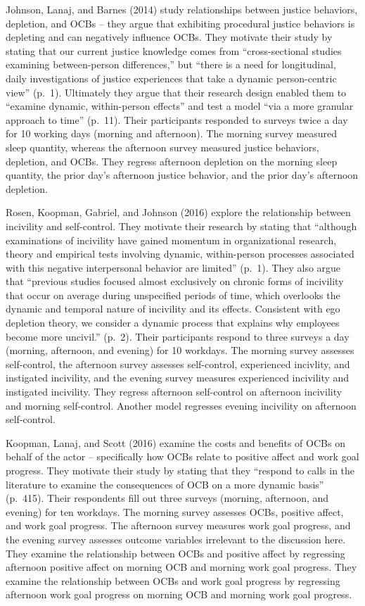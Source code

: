 \documentclass[english,,man]{apa6}
\theoremstyle{definition}
\theoremstyle{definition}
\theoremstyle{definition}
\theoremstyle{remark}
\begin{document}
Johnson, Lanaj, and Barnes (2014) study relationships between justice
behaviors, depletion, and OCBs -- they argue that exhibiting procedural
justice behaviors is depleting and can negatively influence OCBs. They
motivate their study by stating that our current justice knowledge comes
from \enquote{cross-sectional studies examining between-person
differences,} but \enquote{there is a need for longitudinal, daily
investigations of justice experiences that take a dynamic person-centric
view} (p.~1). Ultimately they argue that their research design enabled
them to \enquote{examine dynamic, within-person effects} and test a
model \enquote{via a more granular approach to time} (p.~11). Their
participants responded to surveys twice a day for 10 working days
(morning and afternoon). The morning survey measured sleep quantity,
whereas the afternoon survey measured justice behaviors, depletion, and
OCBs. They regress afternoon depletion on the morning sleep quantity,
the prior day's afternoon justice behavior, and the prior day's
afternoon depletion.

Rosen, Koopman, Gabriel, and Johnson (2016) explore the relationship
between incivility and self-control. They motivate their research by
stating that \enquote{although examinations of incivility have gained
momentum in organizational research, theory and empirical tests
involving dynamic, within-person processes associated with this negative
interpersonal behavior are limited} (p.~1). They also argue that
\enquote{previous studies focused almost exclusively on chronic forms of
incivility that occur on average during unspecified periods of time,
which overlooks the dynamic and temporal nature of incivility and its
effects. Consistent with ego depletion theory, we consider a dynamic
process that explains why employees become more uncivil.} (p.~2). Their
participants respond to three surveys a day (morning, afternoon, and
evening) for 10 workdays. The morning survey assesses self-control, the
afternoon survey assesses self-control, experienced incivlity, and
instigated incivility, and the evening survey measures experienced
incivility and instigated incivility. They regress afternoon
self-control on afternoon incivility and morning self-control. Another
model regresses evening incivility on afternoon self-control.

Koopman, Lanaj, and Scott (2016) examine the costs and benefits of OCBs
on behalf of the actor -- specifically how OCBs relate to positive
affect and work goal progress. They motivate their study by stating that
they \enquote{respond to calls in the literature to examine the
consequences of OCB on a more dynamic basis} (p.~415). Their respondents
fill out three surveys (morning, afternoon, and evening) for ten
workdays. The morning survey assesses OCBs, positive affect, and work
goal progress. The afternoon survey measures work goal progress, and the
evening survey assesses outcome variables irrelevant to the discussion
here. They examine the relationship between OCBs and positive affect by
regressing afternoon positive affect on morning OCB and morning work
goal progress. They examine the relationship between OCBs and work goal
progress by regressing afternoon work goal progress on morning OCB and
morning work goal progress.
\end{document}
